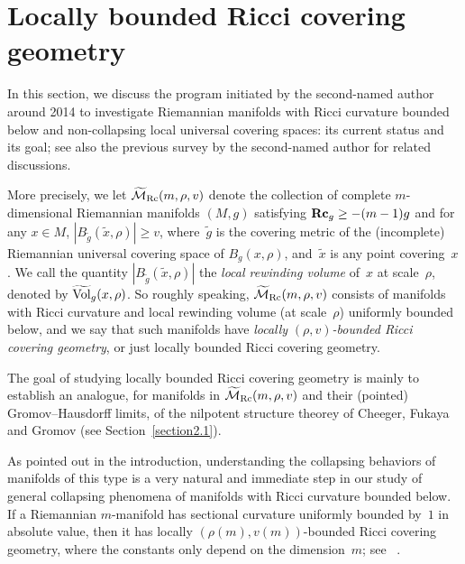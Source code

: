 \documentclass[pdftex]{sigma}
\numberwithin{equation}{section}
\newcommand{\Rc}{\operatorname{\bf Rc}}
\begin{document}
\section{Locally bounded Ricci covering geometry}\label{section3}
In this section, we discuss the program initiated by the second-named author
around 2014 to investigate Riemannian manifolds with Ricci curvature bounded
below and non-collapsing local universal covering spaces: its current status
and its goal; see also the previous survey \cite{Rong18} by the second-named
author for related discussions.

More precisely, we let $\widetilde{\mathcal{M}}_{\rm Rc}(m,\rho,v)$ denote the
collection of complete $m$-dimensional Riemannian manifolds $(M,g)$ satisfying
$\Rc_g\ge -(m-1)g$ and for any $x\in M$, $|B_{\tilde{g}}(\tilde{x}, \rho)
|\ge v$, where~$\tilde{g}$ is the covering metric of the (incomplete)
Riemannian universal covering space of $B_g(x,\rho)$, and~$\tilde{x}$ is any
point covering~$x$. We call the quantity $|B_{\tilde{g}}(\tilde{x},
\rho)|$ the \emph{local rewinding volume} of~$x$ at scale~$\rho$, denoted
by $\widetilde{\rm Vol}_g(x,\rho)$. So roughly speaking,
$\widetilde{\mathcal{M}}_{\rm Rc}(m,\rho,v)$ consists of manifolds with Ricci
curvature and local rewinding volume (at scale~$\rho$) uniformly bounded below,
and we say that such manifolds have \emph{locally} $(\rho,v)$\emph{-bounded
Ricci covering geometry}, or just locally bounded Ricci covering geometry.

The goal of studying locally bounded Ricci covering geometry is mainly to
establish an analogue, for manifolds in $\widetilde{\mathcal{M}}_{\rm Rc}(m,\rho,v)$
and their (pointed) Gromov--Hausdorff limits, of the nilpotent structure theorey
of Cheeger, Fukaya and Gromov (see Section~\ref{section2.1}).

 As pointed out in the introduction, understanding the collapsing behaviors of
 manifolds of this type is a very natural and immediate step in our study of
 general collapsing phenomena of manifolds with Ricci curvature bounded below.
 If a Riemannian $m$-manifold has sectional curvature uniformly bounded by~$1$
 in absolute value, then it has locally $(\rho(m),v(m))$-bounded Ricci covering
 geometry, where the constants only depend on the dimension~$m$; see~
 \cite{CFG92, Rong20}.
\end{document}
